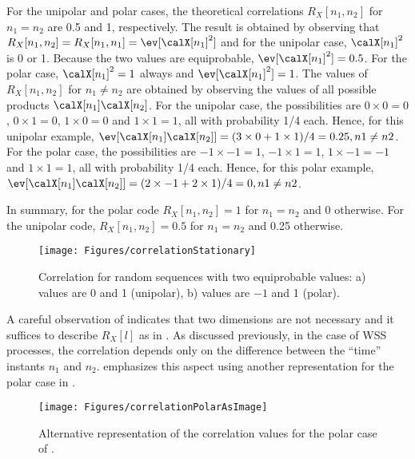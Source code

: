 For the unipolar and polar cases, the theoretical correlations $R_X[n_1,n_2]$ for $n_1=n_2$ are 0.5 and 1, respectively. The result is obtained by observing that $R_X[n_1,n_2]=R_X[n_1,n_1]=\ev[\calX[n_1]^2]$ and for the unipolar case, $\calX[n_1]^2$ is 0 or 1. Because the two values are equiprobable, $\ev[\calX[n_1]^2]=0.5$. For the polar case, $\calX[n_1]^2=1$ always and $\ev[\calX[n_1]^2]=1$. The values of $R_X[n_1,n_2]$ for $n_1 \ne n_2$ are obtained by observing the values of all possible products $\calX[n_1] \calX[n_2]$. For the unipolar case, the possibilities are $0 \times 0 = 0$, $0 \times 1 = 0$, $1 \times 0 = 0$ and $1 \times 1 = 1$, all with probability 1/4 each. Hence, for this unipolar example, $\ev[\calX[n_1] \calX[n_2]] = (3 \times 0 + 1 \times 1)/4 = 0.25, n1 \ne n2$.
For the polar case, the possibilities are $-1 \times -1 = 1$, $-1 \times 1 = 1$, $1 \times -1 = -1$ and $1 \times 1 = 1$, all with probability 1/4 each. Hence, for this polar example, $\ev[\calX[n_1] \calX[n_2]] = (2 \times -1 + 2 \times 1)/4 = 0, n1 \ne n2$.

In summary, for the polar code $R_X[n_1,n_2]=1$ for $n_1=n_2$ and 0 otherwise. For the unipolar code, $R_X[n_1,n_2]=0.5$ for $n_1=n_2$ and 0.25 otherwise.

\begin{figure}[htbp]
\centering
\texttt{[image: Figures/correlationStationary]}
\caption[{Correlation for random sequences with two equiprobable values:}]{Correlation for random sequences with two equiprobable values: a) values are 0 and 1 (unipolar), b) values are $-1$ and 1 (polar).\label{fig:correlationStationary}}
\end{figure}

A careful observation of  indicates that two dimensions are not necessary and it suffices to describe $R_X[l]$ as in .
As discussed previously, in the case of WSS processes, the correlation depends only on the difference between the ``time'' instants $n_1$ and $n_2$. 
  emphasizes this aspect using another representation for
the polar case in .

\begin{figure}[htbp]
\centering
\texttt{[image: Figures/correlationPolarAsImage]}
\caption{Alternative representation of the correlation values for the polar case of .\label{fig:correlationPolarAsImage}}
\end{figure}


